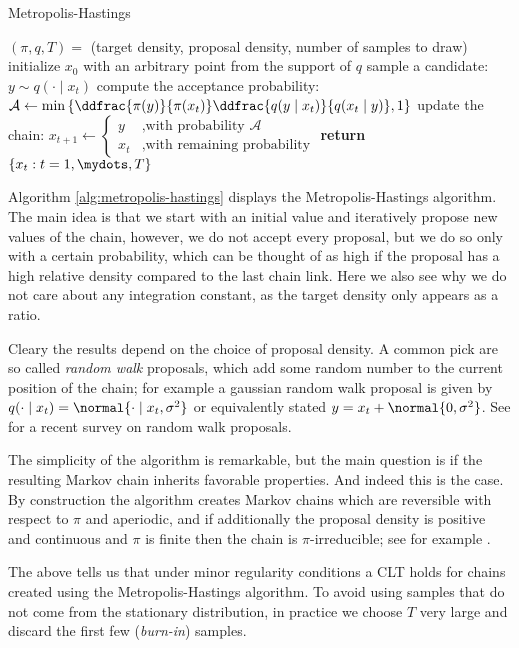 \begin{algorithm}
\caption{Metropolis-Hastings}\label{alg:metropolis-hastings}
\begin{algorithmic}[1]
  \Require $(\pi, q, T) =$ (target density, proposal density, number of samples to draw)
\State initialize $x_0$ with an arbitrary point from the support of $q$
  \State sample a candidate: $y \sim q(\cdot \mid x_t)$
  \State compute the acceptance probability: $\mathcal{A} \gets \min\left\{ \ddfrac{\pi(y)}{\pi(x_t)} \ddfrac{q(y \mid x_t)}{q(x_t \mid y)}, 1\right\}$
  \State update the chain: $x_{t+1} \gets \begin{cases} y &\mbox{,with probability } \mathcal{A}\\ x_t &\mbox{,with remaining probability} \end{cases}$
\EndFor{}
\State \textbf{return} $\{x_t : t = 1,\mydots,T\}$
\end{algorithmic}
\end{algorithm}

\noindent
Algorithm \ref{alg:metropolis-hastings} displays the Metropolis-Hastings algorithm.
The main idea is that we start with an initial value and iteratively propose new values of the chain, however, we do not accept every proposal, but we do so only with a certain probability, which can be thought of as high if the proposal has a high relative density compared to the last chain link.
Here we also see why we do not care about any integration constant, as the target density only appears as a ratio.

Cleary the results depend on the choice of proposal density.
A common pick are so called \emph{random walk} proposals, which add some random number to the current position of the chain; for example a gaussian random walk proposal is given by $q(\cdot \mid x_t) = \normal{\cdot \mid x_t, \sigma^2}$ or equivalently stated $y = x_t + \normal{0, \sigma^2}$.
See \citet{sherlock2010} for a recent survey on random walk proposals.

The simplicity of the algorithm is remarkable, but the main question is if the resulting Markov chain inherits favorable properties.
And indeed this is the case.
By construction the algorithm creates Markov chains which are reversible with respect to $\pi$ and aperiodic, and if additionally the proposal density is positive and continuous and $\pi$ is finite then the chain is $\pi$-irreducible; see for example \citet{roberts2004}.

The above tells us that under minor regularity conditions a CLT holds for chains created using the Metropolis-Hastings algorithm.
To avoid using samples that do not come from the stationary distribution, in practice we choose $T$ very large and discard the first few (\emph{burn-in}) samples.

